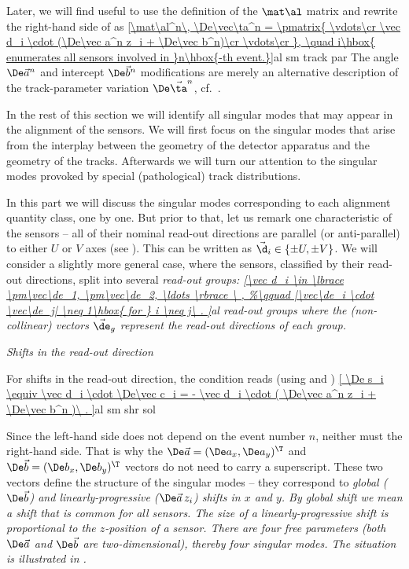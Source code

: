 Later, we will find useful to use the definition of the $\mat\al$ matrix  and rewrite the right-hand side of  as
\eqref{\mat\al^n\, \De\vec\ta^n = \pmatrix{
	\vdots\cr
	\vec d_i \cdot (\De\vec a^n z_i + \De\vec b^n)\cr
	\vdots\cr
}, \quad i\hbox{ enumerates all sensors involved in }n\hbox{-th event.}}{al sm track par}
The angle $\De\vec a^n$ and intercept $\De\vec b^n$ modifications are merely an alternative description of the track-parameter variation $\De\vec\ta^n$, cf.~.

In the rest of this section we will identify all singular modes that may appear in the alignment of the  sensors. We will first focus on the singular modes that arise from the interplay between the geometry of the detector apparatus and the geometry of the tracks. Afterwards we will turn our attention to the singular modes provoked by special (pathological) track distributions.


In this part we will discuss the singular modes corresponding to each alignment quantity class, one by one. But prior to that, let us remark one characteristic of the  sensors -- all of their nominal read-out directions are parallel (or anti-parallel) to either $U$ or $V$ axes (see ). This can be written as $\vec\d_i \in \{\pm U, \pm V\}$. We will consider a slightly more general case, where the sensors, classified by their read-out directions, split into several \em{read-out groups}:
\eqref{\vec d_i \in \lbrace \pm\vec\de_1, \pm\vec\de_2, \ldots \rbrace \ ,
}{al read-out groups}
where the (non-collinear) vectors $\vec\de_g$ represent the read-out directions of each group. 

\baselineskip
\indent\em{Shifts in the read-out direction}
\baselineskip

For shifts in the read-out direction, the condition  reads (using  and )
\eqref{
	\De s_i \equiv
	\vec d_i \cdot \De\vec c_i =
	- \vec d_i \cdot ( \De\vec a^n z_i + \De\vec b^n )\ .
}{al sm shr sol}

Since the left-hand side does not depend on the event number $n$, neither must the right-hand side. That is why the ${\De\vec a}=(\De a_x, \De a_y)^\T$ and ${\De\vec b=(\De b_x, \De b_y)^\T}$ vectors do not need to carry a superscript. These two vectors define the structure of the singular modes -- they correspond to \em{global} ($\De\vec b$) and \em{linearly-progressive} ($\De\vec a\, z_i$) shifts in $x$ and $y$. By global shift we mean a shift that is common for all sensors. The size of a linearly-progressive shift is proportional to the $z$-position of a sensor. There are four free parameters (both $\De\vec a$ and $\De\vec b$ are two-dimensional), thereby four singular modes. The situation is illustrated in .

